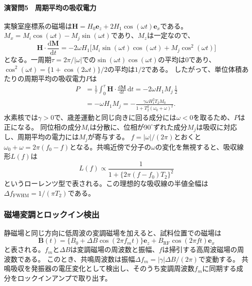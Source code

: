 \documentclass[dvipdfmx,a4paper,11pt]{jsarticle}
\begin{document}
\paragraph{演習問5　周期平均の吸収電力}
実験室座標系の磁場は$\boldsymbol{H}=H_0\boldsymbol{e}_z+2H_1\cos(\omega t)\boldsymbol{e}_x$である。
$M_x=M_i\cos(\omega t)-M_j\sin(\omega t)$であり、$M_z$は一定なので、
\begin{equation}
 \boldsymbol{H}\cdot\frac{\mathrm{d}\boldsymbol{M}}{\mathrm{d}t}
 =-2\omega H_1\bigl[M_i\sin(\omega t)\cos(\omega t)
                    +M_j\cos^2(\omega t)\bigr]
\end{equation}
となる。一周期$\tau=2\pi/|\omega|$での$\sin(\omega t)\cos(\omega t)$の平均は$0$であり、
$\cos^2(\omega t)=\{1+\cos(2\omega t)\}/2$の平均は$1/2$である。
したがって、単位体積あたりの周期平均の吸収電力$P$は
\begin{align}
 P &= \frac{1}{\tau}\int_0^\tau
      \boldsymbol{H}\cdot\frac{\mathrm{d}\boldsymbol{M}}{\mathrm{d}t}\,\mathrm{d}t
    =-2\omega H_1 M_j\,\frac{1}{2}\\
   &= -\omega H_1 M_j
    = -\frac{\gamma\omega H_1^2T_2M_0}{1+T_2^2(\omega_0+\omega)^2}.
\end{align}
水素核では$\gamma>0$で、歳差運動と同じ向きに回る成分には$\omega<0$を取るため、$P$は正になる。
同位相の成分$M_i$は分散に、位相が$90^\circ$ずれた成分$M_j$は吸収に対応し、周期平均の電力には$M_j$が寄与する。
$f=|\omega|/(2\pi)$とおくと$\omega_0+\omega=2\pi(f_0-f)$となる。共鳴近傍で分子の$\omega$の変化を無視すると、吸収線形$L(f)$は
\begin{equation}
 L(f)\propto\frac{1}{1+\{2\pi(f-f_0)T_2\}^2}
\label{eq:bloch-lorentz}
\end{equation}
というローレンツ型で表される。この理想的な吸収線の半値全幅は
$\Delta f_{\mathrm{FWHM}}=1/(\pi T_2)$である。

\subsubsection{磁場変調とロックイン検出}
静磁場と同じ方向に低周波の変調磁場を加えると、試料位置での磁場は
\begin{equation}
 \boldsymbol{B}(t)=\{B_0+\Delta B\cos(2\pi f_m t)\}\boldsymbol{e}_z
 +B_{\mathrm{RF}}\cos(2\pi f t)\boldsymbol{e}_x
\end{equation}
と表される。$f_m$と$\Delta B$は変調磁場の周波数と振幅、$f$は掃引する高周波磁場の周波数である。
このとき、共鳴周波数は振幅$\Delta f_m=|\gamma|\Delta B/(2\pi)$で変動する。
共鳴吸収を発振器の電圧変化として検出し、そのうち変調周波数$f_m$に同期する成分をロックインアンプで取り出す。
\end{document}
